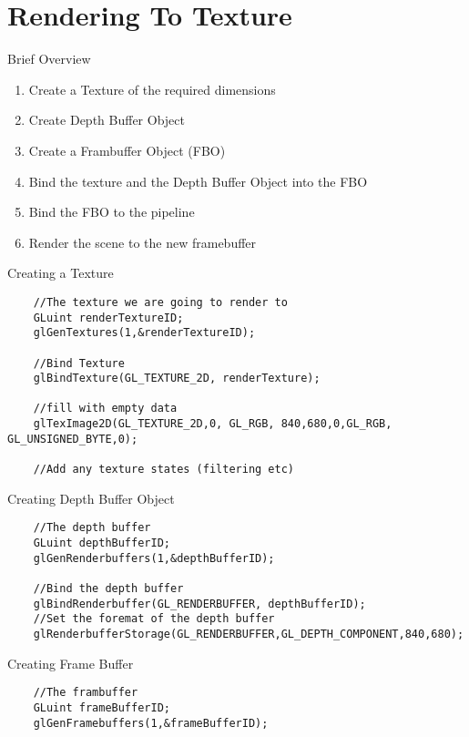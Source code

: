 \part{Rendering To Texture}
\frame{\partpage}

\begin{frame}{Brief Overview}
	\begin{enumerate}
		\item\pause Create a Texture of the required dimensions
		\item\pause Create Depth Buffer Object
		\item\pause Create a Frambuffer Object (FBO)
		\item\pause Bind the texture and the Depth Buffer Object into the FBO
		\item\pause Bind the FBO to the pipeline
		\item\pause Render the scene to the new framebuffer
	\end{enumerate}
\end{frame}

\begin{frame}[fragile]{Creating a Texture}
	\begin{lstlisting}
	//The texture we are going to render to
	GLuint renderTextureID;
	glGenTextures(1,&renderTextureID);
	
	//Bind Texture
	glBindTexture(GL_TEXTURE_2D, renderTexture);
	
	//fill with empty data
	glTexImage2D(GL_TEXTURE_2D,0, GL_RGB, 840,680,0,GL_RGB, GL_UNSIGNED_BYTE,0);
	
	//Add any texture states (filtering etc)
	\end{lstlisting}
\end{frame}

\begin{frame}[fragile]{Creating Depth Buffer Object}
	\begin{lstlisting}
	//The depth buffer
	GLuint depthBufferID;
	glGenRenderbuffers(1,&depthBufferID);
	
	//Bind the depth buffer
	glBindRenderbuffer(GL_RENDERBUFFER, depthBufferID);
	//Set the foremat of the depth buffer
	glRenderbufferStorage(GL_RENDERBUFFER,GL_DEPTH_COMPONENT,840,680);
	\end{lstlisting}
\end{frame}

\begin{frame}[fragile]{Creating Frame Buffer}
	\begin{lstlisting}
	//The frambuffer
	GLuint frameBufferID;
	glGenFramebuffers(1,&frameBufferID);
	\end{lstlisting}
\end{frame}

